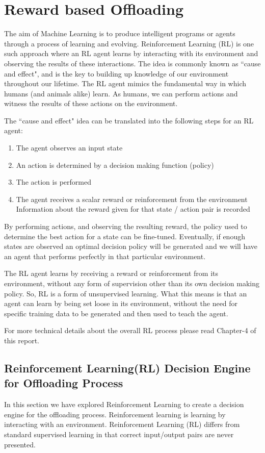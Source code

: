 \documentclass[12pt]{report}
\begin{document}
\chapter{Reward based Offloading} %

The aim of Machine Learning is to produce intelligent programs or agents through a process of learning and evolving. Reinforcement Learning (RL) is one such approach where an RL agent learns by interacting with its environment and observing the results of these interactions. The idea is commonly known as ``cause and effect", and is the key to building up knowledge of our environment throughout our lifetime. The RL agent mimics the fundamental way in which humans (and animals alike) learn. As humans, we can perform actions and witness the results of these actions on the environment.


The ``cause and effect" idea can be translated into the following steps for an RL agent:
\begin{enumerate}
    \item The agent observes an input state
    \item An action is determined by a decision making function (policy)
    \item The action is performed
    \item The agent receives a scalar reward or reinforcement from the environment
    Information about the reward given for that state / action pair is recorded
\end{enumerate}
By performing actions, and observing the resulting reward, the policy used to determine the best action for a state can be fine-tuned. Eventually, if enough states are observed an optimal decision policy will be generated and we will have an agent that performs perfectly in that particular environment. 

The RL agent learns by receiving a reward or reinforcement from its environment, without any form of supervision other than its own decision making policy. So, RL is a form of unsupervised learning. What this means is that an agent can learn by being set loose in its environment, without the need for specific training data to be generated and then used to teach the agent. 

For more technical details about the overall RL process please read Chapter-4 of this report.
\section{Reinforcement Learning(RL) Decision Engine for Offloading Process}
In this section we have explored Reinforcement Learning to create a decision engine for the offloading process. Reinforcement learning is learning by interacting with an environment. Reinforcement Learning (RL) differs from standard supervised learning in that correct input/output pairs are never presented. 
\end{document}
